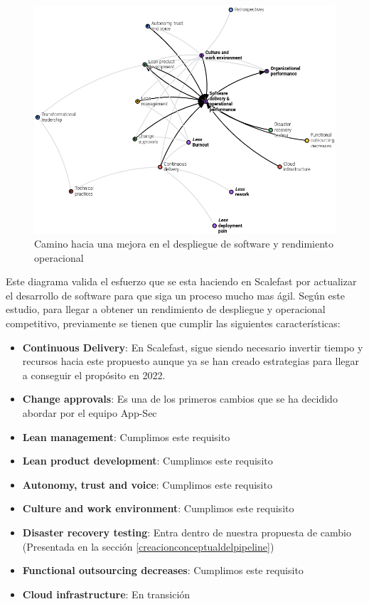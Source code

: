\documentclass[12pt]{report} %
\begin{document}
\begin{figure}[H]
  \includegraphics[width=\textwidth]{DORA-SDOP}
  \caption{Camino hacia una mejora en el despliegue de software y rendimiento
  operacional}
  \label{fig:DORA-SDOP}
\end{figure}

Este diagrama valida el esfuerzo que se esta haciendo en Scalefast por actualizar
el desarrollo de software para que siga un proceso mucho mas ágil.
Según este estudio, para llegar a obtener un rendimiento de despliegue y operacional
competitivo, previamente se tienen que cumplir las siguientes características:

\begin{itemize}
  \item {\textbf{Continuous Delivery}: En Scalefast, sigue siendo necesario
    invertir tiempo y recursos hacia este propuesto aunque ya se han creado
    estrategias para llegar a conseguir el propósito en 2022.}
  \item {\textbf{Change approvals}: Es una de los primeros cambios que se ha decidido
    abordar por el equipo \gls{App-Sec}}
  \item {\textbf{Lean management}: Cumplimos este requisito}
  \item {\textbf{Lean product development}: Cumplimos este requisito}
  \item {\textbf{Autonomy, trust and voice}: Cumplimos este requisito}
  \item {\textbf{Culture and work environment}: Cumplimos este requisito}
  \item {\textbf{Disaster recovery testing}: Entra dentro de nuestra propuesta
    de cambio (Presentada en la sección \ref{creacionconceptualdelpipeline})}
  \item {\textbf{Functional outsourcing decreases}: Cumplimos este requisito}
  \item {\textbf{Cloud infrastructure}: En transición}
\end{itemize}
\end{document}
